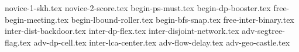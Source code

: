 \documentclass[11pt,a4paper,oneside,korean]{article}
\begin{document}
    \newpage
    {novice-1-skh.tex}            %
    {novice-2-score.tex}          %
    {begin-ps-must.tex}           %
    {begin-dp-booster.tex}     %
    {free-begin-meeting.tex}              %
    {begin-lbound-roller.tex}     %
    {begin-bfs-snap.tex}          %
    {free-inter-binary.tex}       %
    {inter-dist-backdoor.tex}     %
    {inter-dp-flex.tex}           %
    {inter-disjoint-network.tex}  %
    {adv-segtree-flag.tex}        %
    {adv-dp-cell.tex}             %
    {inter-lca-center.tex}        %
    {adv-flow-delay.tex}          %
    {adv-geo-castle.tex}          %
\end{document}

